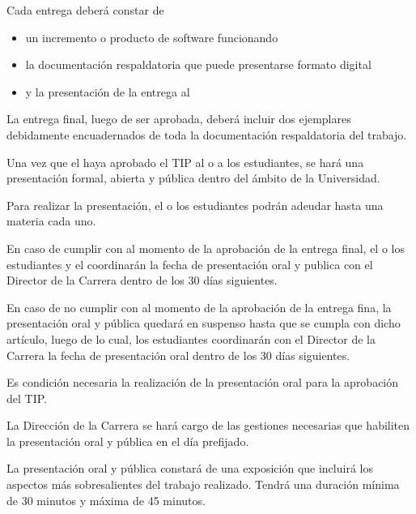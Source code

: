 
\articulo Cada entrega deberá constar de
\begin{itemize}
 \item un incremento o producto de software funcionando
 \item la documentación respaldatoria que puede presentarse formato digital
 \item y la presentación de la entrega al \profesorTIP{}
\end{itemize}


\articulo La entrega final, luego de ser aprobada, deberá incluir dos ejemplares
debidamente encuadernados de toda la documentación respaldatoria del trabajo.


\articulo Una vez que el \profesorTIP{} haya aprobado el TIP al o a los estudiantes, 
se hará una presentación formal, abierta y pública dentro del ámbito de la Universidad. 

\articulo Para realizar la presentación, el o los estudiantes podrán adeudar
hasta una materia cada uno.

\articulo En caso de cumplir con \artCondPresentacion{} al momento de la
aprobación de la entrega final, el o los estudiantes y el \profesorTIP{}
coordinarán la fecha de presentación oral y publica con el Director de la
Carrera dentro de los 30 días siguientes.

\articulo En caso de no cumplir con \artCondPresentacion{} al momento de la
aprobación de la entrega fina, la presentación oral y pública quedará en
suspenso hasta que se cumpla con dicho artículo, luego de lo cual, los estudiantes coordinarán con el
Director de la Carrera la fecha de presentación oral dentro de los 30 días
siguientes.

\articulo Es condición necesaria la realización de la presentación oral para la
aprobación  del TIP.

\articulo La Dirección de la Carrera se hará cargo de las gestiones
necesarias que habiliten la presentación oral y pública en el día prefijado.

\articulo La presentación oral y pública constará de una exposición que incluirá
los aspectos más sobresalientes del trabajo realizado. Tendrá una duración mínima de
30 minutos y máxima de 45 minutos.

